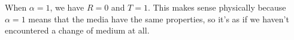 When $\alpha=1$, we have $R=0$ and $T=1$. This makes sense physically
because $\alpha=1$ means that the media have the same properties, so it's
as if we haven't encountered a change of medium at all.
